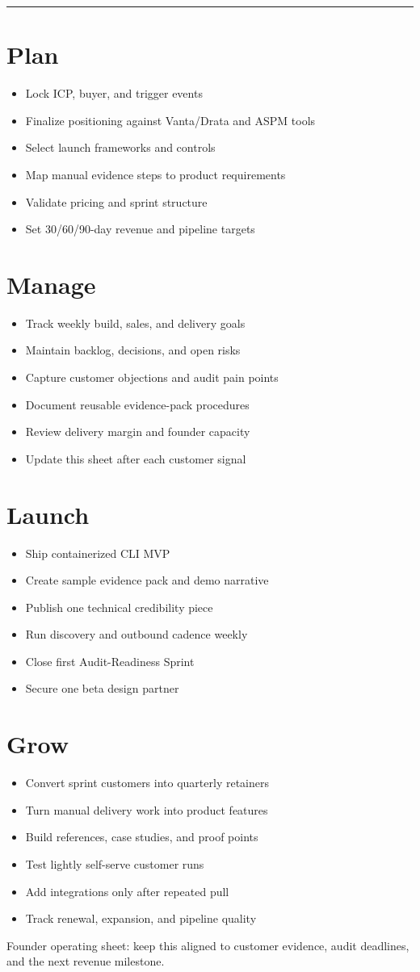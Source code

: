 \documentclass[10pt]{article}
\newcommand{\checkitem}[1]{\item[$\square$] #1}
\begin{document}
\vspace{2pt}
\hrule
\vspace{5pt}

\begin{minipage}[t]{0.49\textwidth}
\section*{Plan}
\begin{itemize}
    \checkitem{Lock ICP, buyer, and trigger events}
    \checkitem{Finalize positioning against Vanta/Drata and ASPM tools}
    \checkitem{Select launch frameworks and controls}
    \checkitem{Map manual evidence steps to product requirements}
    \checkitem{Validate pricing and sprint structure}
    \checkitem{Set 30/60/90-day revenue and pipeline targets}
\end{itemize}

\section*{Manage}
\begin{itemize}
    \checkitem{Track weekly build, sales, and delivery goals}
    \checkitem{Maintain backlog, decisions, and open risks}
    \checkitem{Capture customer objections and audit pain points}
    \checkitem{Document reusable evidence-pack procedures}
    \checkitem{Review delivery margin and founder capacity}
    \checkitem{Update this sheet after each customer signal}
\end{itemize}
\end{minipage}\hfill
\begin{minipage}[t]{0.49\textwidth}
\section*{Launch}
\begin{itemize}
    \checkitem{Ship containerized CLI MVP}
    \checkitem{Create sample evidence pack and demo narrative}
    \checkitem{Publish one technical credibility piece}
    \checkitem{Run discovery and outbound cadence weekly}
    \checkitem{Close first Audit-Readiness Sprint}
    \checkitem{Secure one beta design partner}
\end{itemize}

\section*{Grow}
\begin{itemize}
    \checkitem{Convert sprint customers into quarterly retainers}
    \checkitem{Turn manual delivery work into product features}
    \checkitem{Build references, case studies, and proof points}
    \checkitem{Test lightly self-serve customer runs}
    \checkitem{Add integrations only after repeated pull}
    \checkitem{Track renewal, expansion, and pipeline quality}
\end{itemize}
\end{minipage}

\vfill
{\footnotesize Founder operating sheet: keep this aligned to customer evidence, audit deadlines, and the next revenue milestone.}
\end{document}
